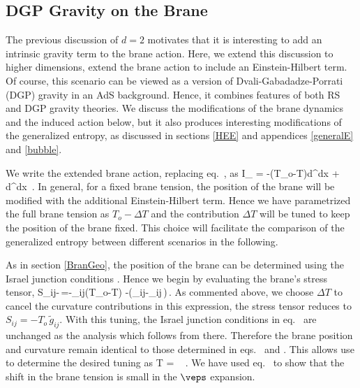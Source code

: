 %

\subsection{DGP Gravity on the Brane} \label{sec:DGP}
The previous discussion of $d=2$ motivates that it is interesting to add an intrinsic gravity term to the brane action. Here, we extend this discussion to higher dimensions, \ie extend the brane action to include an Einstein-Hilbert term. Of course, this scenario can be viewed as a version of Dvali-Gabadadze-Porrati (DGP) gravity \cite{Dvali:2000hr} in an AdS background. Hence, it combines features of both RS and DGP gravity theories. We discuss the modifications of the brane dynamics and the induced action below, but it also produces interesting modifications of the generalized entropy, as discussed in sections \ref{HEE} and appendices \ref{generalE} and \ref{bubble}.

We write the extended brane action, replacing eq.~, as
\beq\label{newbran}
I_ = -(T_o-\Delta T)\int d^dx  + \int d^dx  \,.
\eeq
In general, for a fixed brane tension, the position of the brane will be modified with the additional Einstein-Hilbert term. Hence we have parametrized the full brane tension as $T_o-\Delta T$ and the contribution $\Delta T$ will be tuned to keep the position of the brane fixed. This choice will facilitate the comparison of the generalized entropy between different scenarios in the following.

As in section \ref{BranGeo}, the position of the brane can be determined using the Israel junction conditions . Hence we begin by evaluating the brane's stress tensor,
\beq\label{stressbran}
S_{ij}\equiv -\,=-_{ij}(T_o-\Delta T) -\left(\ric_{ij}-\tg_{ij}\,\ric\right)\,.
\eeq
As commented above, we choose $\Delta T$ to cancel the curvature contributions in this expression, \ie the stress tensor reduces to $S_{ij}=-T_o\,\tilde{g}_{ij}$. With this tuning, the Israel junction conditions in eq.~ are unchanged as the analysis which follows from there. Therefore the brane position and curvature remain identical to those determined in eqs.~ and . This allows use to determine the desired tuning as
\beq\label{tune3}
\Delta T = \ 
\simeq {}\,\veps\,.
\eeq
We have used eq.~ to show that the shift in the brane tension is small in the $\veps$ expansion. 

